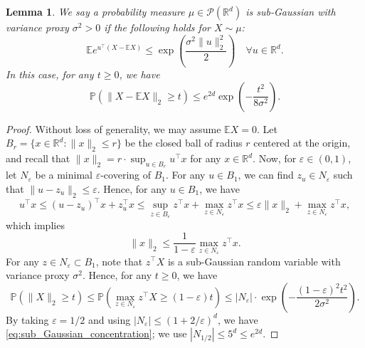 \documentclass[11pt,letterpaper]{article}
\newtheorem{lemma}{Lemma} %
\theoremstyle{definition}
\numberwithin{equation}{section}
\newcommand{\R}{\mathbb{R}}
\newcommand{\E}{\mathbb{E}} %
\renewcommand{\P}{\mathbb{P}}
\renewcommand{\epsilon}{\varepsilon}
\begin{document}
\begin{lemma}
    \label{lem:sub_Gaussian}
    We say a probability measure $\mu \in \mathscr{P}(\R^d)$ is sub-Gaussian with variance proxy $\sigma^2 > 0$ if the following holds for $X \sim \mu$:
    \begin{equation*}
        \E e^{u^\top (X - \E X)} \le \exp\left(\frac{\sigma^2 \|u\|_2^2}{2}\right) \quad \forall u \in \R^d.
    \end{equation*}
    In this case, for any $t \ge 0$, we have 
    \begin{equation}
        \label{eq:sub_Gaussian_concentration}
        \P\left(\|X - \E X\|_2 \ge t\right) \le e^{2 d} \exp\left(-\frac{t^2}{8 \sigma^2}\right).
    \end{equation}
\end{lemma}

\begin{proof}
    Without loss of generality, we may assume $\E X = 0$. Let $B_r = \{x \in \R^d : \|x\|_2 \le r\}$ be the closed ball of radius $r$ centered at the origin, and recall that $\|x\|_2 = r \cdot \sup_{u \in B_r} u^\top x$ for any $x \in \R^d$. Now, for $\epsilon \in (0, 1)$, let $N_\epsilon$ be a minimal $\epsilon$-covering of $B_1$. For any $u \in B_1$, we can find $z_u \in N_\epsilon$ such that $\|u - z_u\|_2 \le \epsilon$. Hence, for any $u \in B_1$, we have
    \begin{equation*}
        u^\top x \le (u - z_u)^\top x + z_u^\top x \le \sup_{z \in B_\epsilon} z^\top x + \max_{z \in N_\epsilon} z^\top x \le \epsilon \|x\|_2 + \max_{z \in N_\epsilon} z^\top x,
    \end{equation*}
    which implies 
    \begin{equation*}
        \|x\|_2 \le \frac{1}{1 - \epsilon} \max_{z \in N_\epsilon} z^\top x.
    \end{equation*}
    For any $z \in N_\epsilon \subset B_1$, note that $z^\top X$ is a sub-Gaussian random variable with variance proxy $\sigma^2$. Hence, for any $t \ge 0$, we have 
    \begin{equation*}
        \P(\|X\|_2 \ge t) 
        \le \P(\max_{z \in N_\epsilon} z^\top X \ge (1 - \epsilon) t) \le |N_\epsilon| \cdot \exp\left(-\frac{(1 - \epsilon)^2 t^2}{2 \sigma^2}\right).
    \end{equation*}
    By taking $\epsilon = 1 / 2$ and using $|N_\epsilon| \le (1 + 2 / \epsilon)^d$, we have \eqref{eq:sub_Gaussian_concentration}; we use $|N_{1 / 2}| \le 5^d \le e^{2 d}$.
\end{proof}
\end{document}
